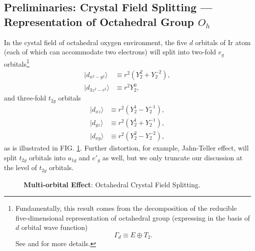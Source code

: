 \documentclass[10pt,nofootinbib]{revtex4}
\begin{document}
	\subsection{Preliminaries: Crystal Field Splitting --- Representation of Octahedral Group $O_h$}
		In the cystal field of octahedral oxygen environment, the five $d$ orbitals of $\mathrm{Ir}$ atom (each of which can accommodate two electrons) will split into two-fold $e_g$ orbitals\footnote{Fundamentally, this result comes from the decomposition of the reducible five-dimensional representation of octahedral group (expressing in the basis of $d$ orbital wave function) \begin{equation*}
			\Gamma_d\equiv E\oplus T_2.
		\end{equation*}
		See \cite{sugano2012multiplets} and \cite{patrik1999lecture} for more details.}
		\begin{align*}
			|d_{x^2-y^2}\rangle&\equiv r^2(Y_2^2+Y_2^{-2}),\\
			|d_{3z^2-r^2}\rangle&\equiv r^2Y^0_2,
		\end{align*}
		and three-fold $t_{2g}$ orbitals
		\begin{align*}
			|d_{xz}\rangle&\equiv r^2(Y^1_2-Y_2^{-1}),\\
			|d_{yz}\rangle&\equiv r^2(Y^1_2+Y_2^{-1}),\\
			|d_{xy}\rangle&\equiv r^2(Y^2_2-Y_2^{-2}),
		\end{align*}
		as is illustrated in FIG. \ref{fig:1}. Further distortion, for example, Jahn-Teller effect, will split $t_{2g}$ orbitals into $a_{1g}$ and $e'_g$ as well, but we only truncate our discussion at the level of $t_{2g}$ orbitals.
		\begin{figure}[!htp]
			\centering
			\caption{{\bf Multi-orbital Effect}: Octahedral Crystal Field Splitting.}
			\label{fig:1}
		\end{figure}
\end{document}
